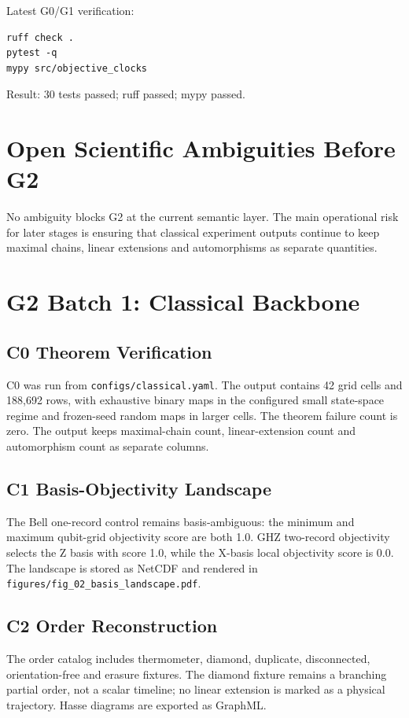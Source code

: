 \documentclass[11pt]{article}
\begin{document}
Latest G0/G1 verification:
\begin{verbatim}
ruff check .
pytest -q
mypy src/objective_clocks
\end{verbatim}

Result: 30 tests passed; ruff passed; mypy passed.

\section{Open Scientific Ambiguities Before G2}

No ambiguity blocks G2 at the current semantic layer. The main operational risk
for later stages is ensuring that classical experiment outputs continue to keep
maximal chains, linear extensions and automorphisms as separate quantities.

\section{G2 Batch 1: Classical Backbone}

\subsection{C0 Theorem Verification}

C0 was run from \texttt{configs/classical.yaml}. The output contains 42 grid
cells and 188,692 rows, with exhaustive binary maps in the configured small
state-space regime and frozen-seed random maps in larger cells. The theorem
failure count is zero. The output keeps maximal-chain count, linear-extension
count and automorphism count as separate columns.

\subsection{C1 Basis-Objectivity Landscape}

The Bell one-record control remains basis-ambiguous: the minimum and maximum
qubit-grid objectivity score are both 1.0. GHZ two-record objectivity selects the
Z basis with score 1.0, while the X-basis local objectivity score is 0.0. The
landscape is stored as NetCDF and rendered in
\texttt{figures/fig_02_basis_landscape.pdf}.

\subsection{C2 Order Reconstruction}

The order catalog includes thermometer, diamond, duplicate, disconnected,
orientation-free and erasure fixtures. The diamond fixture remains a branching
partial order, not a scalar timeline; no linear extension is marked as a physical
trajectory. Hasse diagrams are exported as GraphML.
\end{document}
